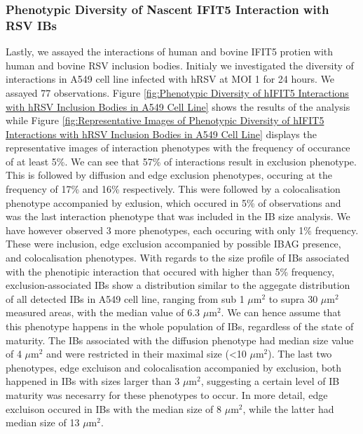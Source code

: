 \subsubsection{Phenotypic Diversity of Nascent IFIT5 Interaction with RSV IBs}
Lastly, we assayed the interactions of human and bovine IFIT5 protien with human and bovine RSV inclusion bodies. Initialy we investigated the diversity of interactions in A549 cell line infected with hRSV at MOI 1 for 24 hours. We assayed 77 observations. Figure \ref{fig:Phenotypic Diversity of hIFIT5 Interactions with hRSV Inclusion Bodies in A549 Cell Line} shows the results of the analysis while Figure \ref{fig:Representative Images of Phenotypic Diversity of hIFIT5 Interactions with hRSV Inclusion Bodies in A549 Cell Line} displays the representative images of interaction phenotypes with the frequency of occurance of at least 5\%. We can see that 57\% of interactions result in exclusion phenotype. This is followed by diffusion and edge exclusion phenotypes, occuring at the frequency of 17\% and 16\% respectively. This were followed by a colocalisation phenotype accompanied by exlusion, which occured in 5\% of observations and was the last interaction phenotype that was included in the IB size analysis. We have however observed 3 more phenotypes, each occuring with only 1\% frequency. These were inclusion, edge exclusion accompanied by possible IBAG presence, and colocalisation phenotypes. With regards to the size profile of IBs associated with the phenotipic interaction that occured with higher than 5\% frequency, exclusion-associated IBs show a distribution similar to the aggegate distribution of all detected IBs in A549 cell line, ranging from sub 1 \(\mu \mbox{m}^2\) to supra 30 \(\mu \mbox{m}^2\) measured areas, with the median value of 6.3 \(\mu \mbox{m}^2\). We can hence assume that this phenotype happens in the whole population of IBs, regardless of the state of maturity. The IBs associated with the diffusion phenotype had median size value of 4 \(\mu \mbox{m}^2\) and were restricted in their maximal size (<10 \(\mu \mbox{m}^2\)). The last two phenotypes, edge excluison and colocalisation accompanied by exclusion, both happened in IBs with sizes larger than 3 \(\mu \mbox{m}^2\), suggesting a certain level of IB maturity was necesarry for these phenotypes to occur. In more detail, edge excluison occured in IBs with the median size of 8 \(\mu \mbox{m}^2\), while the latter had median size of 13 \(\mu \mbox{m}^2\).

